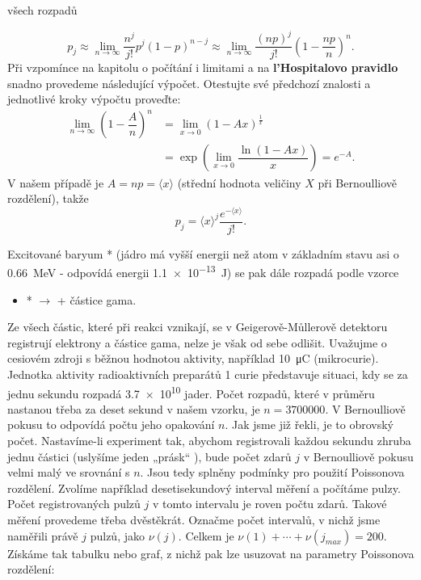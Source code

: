 \begin{mdframed}[style=mdexam]
\begin{example}
\begin{itemize}
            všech rozpadů
    \end{itemize}
    \begin{equation*}
      p_j \approx \lim\limits_{n\rightarrow\infty}\dfrac{n^j}{j!}p^j(1-p)^{n - j}
          \approx \lim\limits_{n\rightarrow\infty}\dfrac{(np)^j}{j!}\left(1-\dfrac{np}{n}\right)^{n}.
    \end{equation*}
    Při vzpomínce na kapitolu o počítání i limitami a na \textbf{l’Hospitalovo pravidlo} snadno
    provedeme následující výpočet. Otestujte své předchozí znalosti a jednotlivé kroky výpočtu
    proveďte:
    \begin{align*}
      \lim\limits_{n\rightarrow\infty}\left(1 - \dfrac{A}{n}\right)^n 
        &= \lim\limits_{x\rightarrow0}\left(1 - Ax\right)^\frac{1}{x}   \\
        &= \exp\left(\lim\limits_{x\rightarrow0}\dfrac{\ln(1 - Ax)}{x}\right) = e^{-A}.
    \end{align*}
    V našem případě je \(A = np = \langle x \rangle\) (střední hodnota veličiny \(X\) při
    Bernoulliově rozdělení), takže
    \begin{equation}\label{mai:eq065}
      p_j = \langle x \rangle^j\dfrac{e^{-\langle x \rangle}}{j!}.
    \end{equation}
 
    Excitované baryum * (jádro má vyšší energii než atom  v základním stavu
    asi o \SI{0.66}{\mega\electronvolt}  - odpovídá energii \SI{1.1e-13}{\joule}) se pak dále
    rozpadá podle vzorce
    \begin{itemize}
      \item {}* \(\longrightarrow\)  + částice gama.
    \end{itemize}

    Ze všech částic, které při reakci vznikají, se v Geigerově-Můllerově detektoru registrují
    elektrony a částice gama, nelze je však od sebe odlišit. Uvažujme o cesiovém zdroji s běžnou
    hodnotou aktivity, například \SI{10}{\micro\coulomb} (mikrocurie). Jednotka aktivity
    radioaktivních preparátů \num{1} curie představuje situaci, kdy se za jednu sekundu rozpadá
    \num{3.7e10} jader. Počet rozpadů, které v průměru nastanou třeba za deset sekund v našem
    vzorku, je \(n = \num{3700000}\). V Bernoulliově pokusu to odpovídá počtu jeho opakování \(n\).
    Jak jsme již řekli, je to obrovský počet. Nastavíme-li experiment tak, abychom registrovali
    každou sekundu zhruba jednu částici (uslyšíme jeden „prásk“ ), bude počet zdarů \(j\) v
    Bernoulliově pokusu velmi malý ve srovnání s \(n\). Jsou tedy splněny podmínky pro použití
    Poissonova rozdělení. Zvolíme například desetisekundový interval měření a počítáme pulzy. Počet
    registrovaných pulzů \(j\) v tomto intervalu je roven počtu zdarů. Takové měření provedeme třeba
    dvěstěkrát. Označme počet intervalů, v nichž jsme naměřili právě \(j\) pulzů, jako \(\nu(j)\).
    Celkem je \(\nu(1) + \cdots + \nu(j_{max}) = \num{200}\). Získáme tak tabulku nebo graf, z nichž
    pak lze usuzovat na parametry Poissonova rozdělení:


\end{example}
\end{mdframed}
